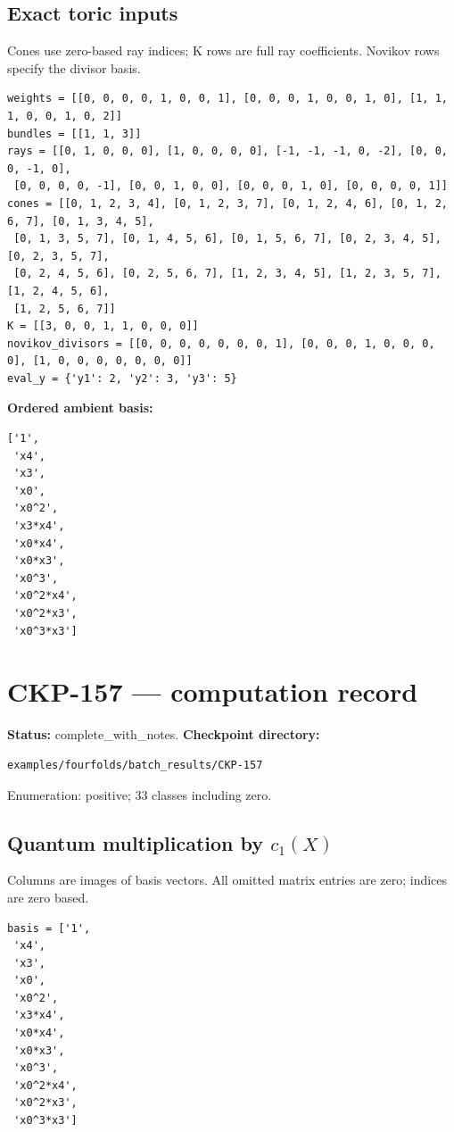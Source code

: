 \documentclass[10pt,a4paper]{article}
\begin{document}
\subsection*{Exact toric inputs}
Cones use zero-based ray indices; K rows are full ray coefficients. Novikov rows specify the divisor basis.

\begin{lstlisting}
weights = [[0, 0, 0, 0, 1, 0, 0, 1], [0, 0, 0, 1, 0, 0, 1, 0], [1, 1, 1, 0, 0, 1, 0, 2]]
bundles = [[1, 1, 3]]
rays = [[0, 1, 0, 0, 0], [1, 0, 0, 0, 0], [-1, -1, -1, 0, -2], [0, 0, 0, -1, 0],
 [0, 0, 0, 0, -1], [0, 0, 1, 0, 0], [0, 0, 0, 1, 0], [0, 0, 0, 0, 1]]
cones = [[0, 1, 2, 3, 4], [0, 1, 2, 3, 7], [0, 1, 2, 4, 6], [0, 1, 2, 6, 7], [0, 1, 3, 4, 5],
 [0, 1, 3, 5, 7], [0, 1, 4, 5, 6], [0, 1, 5, 6, 7], [0, 2, 3, 4, 5], [0, 2, 3, 5, 7],
 [0, 2, 4, 5, 6], [0, 2, 5, 6, 7], [1, 2, 3, 4, 5], [1, 2, 3, 5, 7], [1, 2, 4, 5, 6],
 [1, 2, 5, 6, 7]]
K = [[3, 0, 0, 1, 1, 0, 0, 0]]
novikov_divisors = [[0, 0, 0, 0, 0, 0, 0, 1], [0, 0, 0, 1, 0, 0, 0, 0], [1, 0, 0, 0, 0, 0, 0, 0]]
eval_y = {'y1': 2, 'y2': 3, 'y3': 5}
\end{lstlisting}

\textbf{Ordered ambient basis:}
\begin{lstlisting}
['1',
 'x4',
 'x3',
 'x0',
 'x0^2',
 'x3*x4',
 'x0*x4',
 'x0*x3',
 'x0^3',
 'x0^2*x4',
 'x0^2*x3',
 'x0^3*x3']
\end{lstlisting}

\clearpage\section*{CKP-157 --- computation record}
\textbf{Status:} complete\_with\_notes.
\textbf{Checkpoint directory:}
\begin{lstlisting}
examples/fourfolds/batch_results/CKP-157
\end{lstlisting}

Enumeration: positive; 33 classes including zero.
\subsection*{Quantum multiplication by $c_1(X)$}
Columns are images of basis vectors. All omitted matrix entries are zero; indices are zero based.

\begin{lstlisting}
basis = ['1',
 'x4',
 'x3',
 'x0',
 'x0^2',
 'x3*x4',
 'x0*x4',
 'x0*x3',
 'x0^3',
 'x0^2*x4',
 'x0^2*x3',
 'x0^3*x3']
\end{lstlisting}
\end{document}

